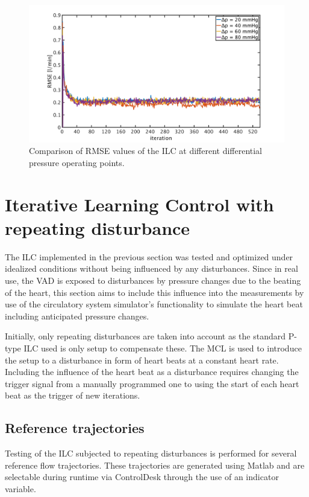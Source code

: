 \begin{figure}[ht]
  \centering
  \includegraphics[width=\textwidth]{images/chapt_5/ILC/RMSE_compare_operating_points.pdf}
  \caption[Comparison of RMSE values of the ILC at different differential pressure operating points]{Comparison of RMSE values of the ILC at different differential pressure operating points.}
  \label{fig:RMSE_compare_operating_points}
\end{figure}
\section{Iterative Learning Control with repeating disturbance}

The ILC implemented in the previous section was tested and optimized under idealized conditions without being influenced by any disturbances. Since in real use, the VAD is exposed to disturbances by pressure changes due to the beating of the heart, this section aims to include this influence into the measurements by use of the circulatory system simulator's functionality to simulate the heart beat including anticipated pressure changes.

Initially, only repeating disturbances are taken into account as the standard P-type ILC used is only setup to compensate these.
The MCL is used to introduce the setup to a disturbance in form of heart beats at a constant heart rate. Including the influence of the heart beat as a disturbance requires changing the trigger signal from a manually programmed one to using the start of each heart beat as the trigger of new iterations.
\subsection{Reference trajectories}\label{ref_traject}
Testing of the ILC subjected to repeating disturbances is performed for several reference flow trajectories. These trajectories are generated using Matlab and are selectable during runtime via ControlDesk through the use of an indicator variable.

